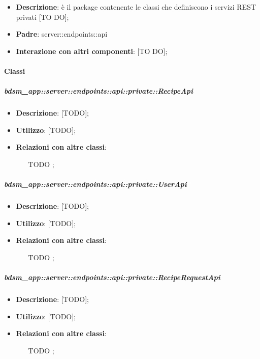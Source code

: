 \begin{itemize}
  \item \textbf{Descrizione}: è il package contenente le classi che definiscono i servizi REST privati [TO DO];
  \item \textbf{Padre}: server::endpoints::api
  \item \textbf{Interazione con altri componenti}: [TO DO];
\end{itemize}

	\paragraph{Classi} %

    \subparagraph{bdsm\_app::server::endpoints::api::private::RecipeApi} %
    \label{subp:bdsm_app_server_endpoints_api_private_recipeapi}
    \begin{itemize}
      \item \textbf{Descrizione}: [TODO];
      \item \textbf{Utilizzo}: [TODO];
      \item \textbf{Relazioni con altre classi}:
        \begin{itemize}
          \item [TODO];
        \end{itemize}
      \end{itemize}
    
    \subparagraph{bdsm\_app::server::endpoints::api::private::UserApi} %
    \label{subp:bdsm_app_server_endpoints_api_private_userapi}
    \begin{itemize}
      \item \textbf{Descrizione}: [TODO];
      \item \textbf{Utilizzo}: [TODO];
      \item \textbf{Relazioni con altre classi}:
        \begin{itemize}
          \item [TODO];
        \end{itemize}
      \end{itemize}
    
    \subparagraph{bdsm\_app::server::endpoints::api::private::RecipeRequestApi} %
    \label{subp:bdsm_app_server_endpoints_api_private::reciperequestapi}
    \begin{itemize}
      \item \textbf{Descrizione}: [TODO];
      \item \textbf{Utilizzo}: [TODO];
      \item \textbf{Relazioni con altre classi}:
        \begin{itemize}
          \item [TODO];
        \end{itemize}
      \end{itemize}
    
